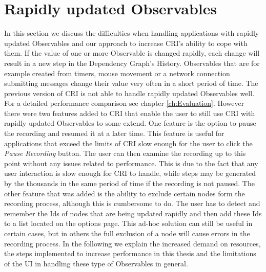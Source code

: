 \section{Rapidly updated Observables}
\label{sec:RapidlyUpdatedObservables}
In this section we discuss the difficulties when handling applications with rapidly updated Observables and our approach to increase CRI's ability to cope with them. If the value of one or more Observable is changed rapidly, each change will result in a new step in the Dependency Graph's History. Observables that are for example created from timers, mouse movement or a network connection submitting messages change their value very often in a short period of time. The previous version of CRI is not able to handle rapidly updated Observables well. For a detailed performance comparison see chapter \ref{ch:Evaluation}. However there were two features added to CRI that enable the user to still use CRI with rapidly updated Observables to some extend. One feature is the option to pause the recording and resumed it at a later time. This feature is useful for applications that exceed the limits of CRI slow enough for the user to click the \emph{Pause Recording} button. The user can then examine the recording up to this point without any issues related to performance. This is due to the fact that any user interaction is slow enough for CRI to handle, while steps may be generated by the thousands in the same period of time if the recording is not paused. The other feature that was added is the ability to exclude certain nodes form the recording process, although this is cumbersome to do. The user has to detect and remember the Ids of nodes that are being updated rapidly and then add these Ids to a list located on the options page. This ad-hoc solution can still be useful in certain cases, but in others the full exclusion of a node will cause errors in the recording process. In the following we explain the increased demand on resources, the steps implemented to increase performance in this thesis and the limitations of the UI in handling these type of Observables in general. 


